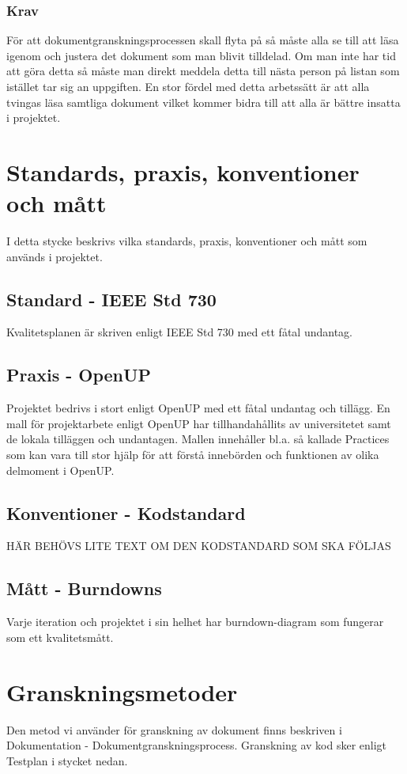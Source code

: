 \subsubsection{Krav}
För att dokumentgranskningsprocessen skall flyta på så måste alla se till att läsa igenom och justera det dokument som man blivit tilldelad. Om man inte har tid att göra detta så måste man direkt meddela detta till nästa person på listan som istället tar sig an uppgiften. En stor fördel med detta arbetssätt är att alla tvingas läsa samtliga dokument vilket kommer bidra till att alla är bättre insatta i projektet.

\section{Standards, praxis, konventioner och mått}
I detta stycke beskrivs vilka standards, praxis, konventioner och mått som används i projektet.

\subsection{Standard - IEEE Std 730}
Kvalitetsplanen är skriven enligt IEEE Std 730 med ett fåtal undantag.

\subsection{Praxis - OpenUP}
Projektet bedrivs i stort enligt OpenUP med ett fåtal undantag och tillägg. En mall för projektarbete enligt OpenUP har tillhandahållits av universitetet samt de lokala tilläggen och undantagen. Mallen innehåller bl.a. så kallade Practices som kan vara till stor hjälp för att förstå innebörden och funktionen av olika delmoment i OpenUP.

\subsection{Konventioner - Kodstandard}
HÄR BEHÖVS LITE TEXT OM DEN KODSTANDARD SOM SKA FÖLJAS

\subsection{Mått - Burndowns}
Varje iteration och projektet i sin helhet har burndown-diagram som fungerar som ett kvalitetsmått. 

\section{Granskningsmetoder}
Den metod vi använder för granskning av dokument finns beskriven i Dokumentation - Dokumentgranskningsprocess. Granskning av kod sker enligt Testplan i stycket nedan.

